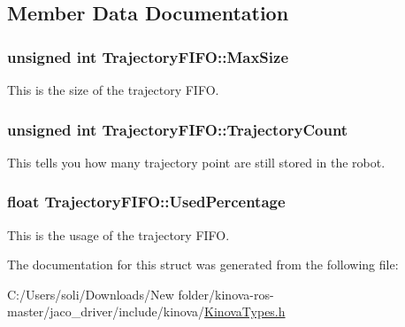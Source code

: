 \subsection{Member Data Documentation}
\subsubsection[{\texorpdfstring{Max\+Size}{MaxSize}}]{\setlength{\rightskip}{0pt plus 5cm}unsigned int Trajectory\+F\+I\+F\+O\+::\+Max\+Size}\hypertarget{struct_trajectory_f_i_f_o_ab57ade5bd66a71bfede38fb4d300d1d7}{}\label{struct_trajectory_f_i_f_o_ab57ade5bd66a71bfede38fb4d300d1d7}


This is the size of the trajectory F\+I\+FO. 

\subsubsection[{\texorpdfstring{Trajectory\+Count}{TrajectoryCount}}]{\setlength{\rightskip}{0pt plus 5cm}unsigned int Trajectory\+F\+I\+F\+O\+::\+Trajectory\+Count}\hypertarget{struct_trajectory_f_i_f_o_a8d2d82f71459128dd803eb7c9e09c2c6}{}\label{struct_trajectory_f_i_f_o_a8d2d82f71459128dd803eb7c9e09c2c6}


This tells you how many trajectory point are still stored in the robot. 

\subsubsection[{\texorpdfstring{Used\+Percentage}{UsedPercentage}}]{\setlength{\rightskip}{0pt plus 5cm}float Trajectory\+F\+I\+F\+O\+::\+Used\+Percentage}\hypertarget{struct_trajectory_f_i_f_o_aa522f62f9f815f31be1d03c0b89653f5}{}\label{struct_trajectory_f_i_f_o_aa522f62f9f815f31be1d03c0b89653f5}


This is the usage of the trajectory F\+I\+FO. 



The documentation for this struct was generated from the following file\+:\begin{DoxyCompactItemize}
\item 
C\+:/\+Users/soli/\+Downloads/\+New folder/kinova-\/ros-\/master/jaco\+\_\+driver/include/kinova/\hyperlink{_kinova_types_8h}{Kinova\+Types.\+h}\end{DoxyCompactItemize}
